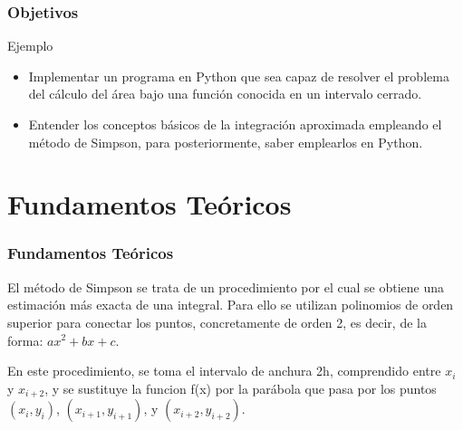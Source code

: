 \documentclass{beamer}
\begin{document}
\begin{frame}

\frametitle{Objetivos }

\begin{block}{Ejemplo}
  \begin{itemize}
  \item
   Implementar un programa en Python que sea capaz de resolver el problema del cálculo del área bajo una función conocida en un 
   intervalo cerrado.
  \pause
  \item
   Entender los conceptos básicos de la integración aproximada empleando el método de Simpson, para posteriormente, saber emplearlos
   en Python.

  \end{itemize}
\end{block}

\end{frame}

\section{Fundamentos Teóricos}

\begin{frame}
\frametitle{Fundamentos Teóricos}
	El método de Simpson se trata de un procedimiento por el cual se obtiene una estimación más exacta de una integral. Para ello se 
utilizan polinomios de orden superior para conectar los puntos, concretamente de orden 2, es decir, de la forma: $ ax^2 + bx + c $.

	En este procedimiento, se toma el intervalo de anchura 2h, comprendido entre $x_{i}$ y $ x_{i+2} $, y se sustituye la funcion f(x) por la parábola que pasa por los puntos $ (x_{i},y_{i}) $, $ (x_{i+1},y_{i+1}) $, y $ (x_{i+2},y_{i+2}) $.

\end{frame}
\end{document}
